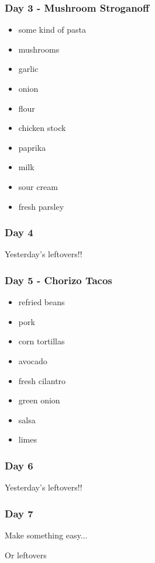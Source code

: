 \documentclass[11pt, a4paper]{article}
\begin{document}
\subsubsection{Day 3 - Mushroom Stroganoff}
\vspace{1pc}
\begin{itemize}
\item some kind of pasta
\item mushrooms
\item garlic
\item onion
\item flour
\item chicken stock
\item paprika
\item milk
\item sour cream
\item fresh parsley
\end{itemize}

\subsubsection{Day 4}
\vspace{1pc}
Yesterday's leftovers!!

\subsubsection{Day 5 - Chorizo Tacos}
\vspace{1pc}
\begin{itemize}
\item refried beans
\item pork
\item corn tortillas
\item avocado
\item fresh cilantro
\item green onion
\item salsa
\item limes
\end{itemize}

\subsubsection{Day 6}
\vspace{1pc}
Yesterday's leftovers!!

\subsubsection{Day 7}
\vspace{1pc}
\noindent Make something easy...
\par
Or leftovers
\end{document}
